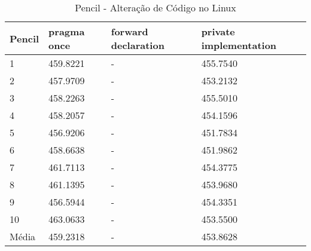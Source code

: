\begin{table}[!h]
\centering
\caption{Pencil - Alteração de Código no Linux}
\label{tab:alteracao_de_codigo:linux:pencil}
\begin{tabular}{llll}
\textbf{Pencil} & \textbf{pragma once} & \textbf{forward declaration} & \textbf{private implementation}   \\ \toprule
1                                    &  459.8221  &  -   & 455.7540      \\ 
2                                    &  457.9709  &  -   & 453.2132      \\ 
3                                    &  458.2263  &  -   & 455.5010      \\ 
4                                    &  458.2057  &  -   & 454.1596      \\ 
5                                    &  456.9206  &  -   & 451.7834      \\ 
6                                    &  458.6638  &  -   & 451.9862      \\ 
7                                    &  461.7113  &  -   & 454.3775      \\ 
8                                    &  461.1395  &  -   & 453.9680      \\ 
9                                    &  456.5944  &  -   & 454.3351      \\ 
10                                   &  463.0633  &  -   & 453.5500      \\ \bottomrule 
Média                                &  459.2318  &  -   & 453.8628      \\
\end{tabular}
\end{table}

